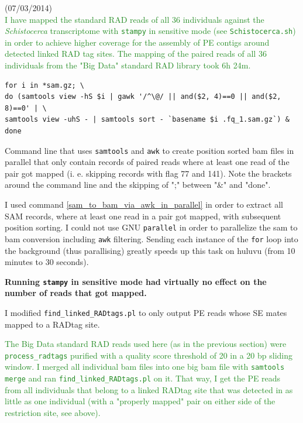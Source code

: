 \documentclass{article}\usepackage[]{graphicx}\usepackage[]{color}
\newcommand{\roger}[1]{ \textcolor[named]{ForestGreen}{#1} }
\begin{document}
(07/03/2014)\\
\roger{I have mapped the standard RAD reads of all 36 individuals against the \textit{Schistocerca} transcriptome with \texttt{stampy} in sensitive mode (see \texttt{Schistocerca.sh}) in order to achieve higher coverage for the assembly of PE contigs around detected linked RAD tag sites. The mapping of the paired reads of all 36 individuals from the  "Big Data" standard RAD library took 6h 24m.}

\begin{command}
\captionsetup{type=command}
\begin{Verbatim}[fontsize=\footnotesize]
for i in *sam.gz; \
do (samtools view -hS $i | gawk '/^\@/ || and($2, 4)==0 || and($2, 8)==0' | \
samtools view -uhS - | samtools sort - `basename $i .fq_1.sam.gz`) & done
\end{Verbatim}
\caption{Command line that uses \texttt{samtools} and \texttt{awk} to create position sorted bam files in parallel that only contain records of paired reads where at least one read of the pair got mapped (i. e. skipping records with flag 77 and 141). \scriptsize{Note the brackets around the command line and the skipping of ";" between "\&" and "done"}. }
\label{sam_to_bam_via_awk_in_parallel}
\end{command}

I used command \ref{sam_to_bam_via_awk_in_parallel} in order to extract all SAM records, where at least one read in a pair got mapped, with subsequent position sorting. I could not use GNU \texttt{parallel} in order to parallelize the sam to bam conversion including \texttt{awk} filtering. Sending each instance of the \texttt{for} loop into the background (thus parallising) greatly speeds up this task on huluvu (from 10 minutes to 30 seconds). 

\textbf{Running \texttt{stampy} in sensitive mode had virtually no effect on the number of reads that got mapped.}

I modified \texttt{find\_linked\_RADtags.pl} to only output PE reads whose SE mates mapped to a RADtag site.

\roger{The Big Data standard RAD reads used here (as in the previous section) were \texttt{process\_radtags} purified with a quality score threshold of 20 in a 20 bp sliding window. I merged all individual bam files into one big bam file with \texttt{samtools merge} and ran \texttt{find\_linked\_RADtags.pl} on it. That way, I get the PE reads from all individuals that belong to a linked RADtag site that was detected in as little as one individual (with a "properly mapped" pair on either side of the restriction site, see above).}
\end{document}

